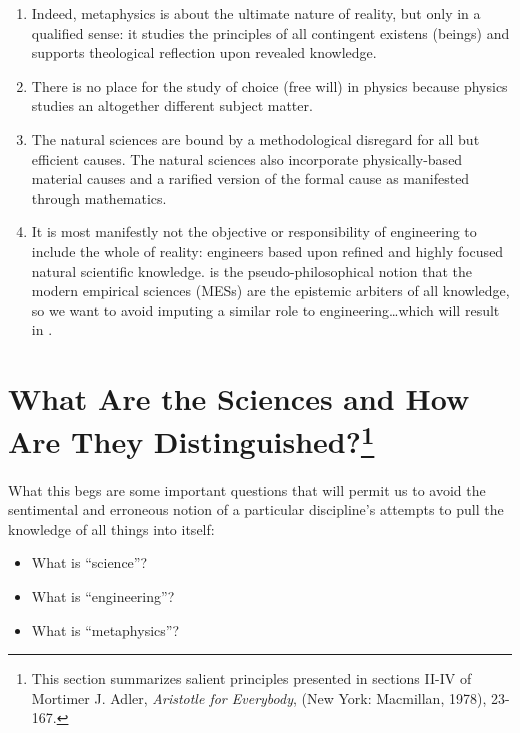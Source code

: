\begin{enumerate}
\item Indeed, metaphysics is about the ultimate nature of reality, but only in a qualified sense: it studies the principles of all contingent existens (beings) and supports theological reflection upon revealed knowledge.
\item There is no place for the study of choice (free will) in physics because physics studies an altogether different subject matter.
\item The natural sciences are  bound by a methodological disregard for all but efficient causes. The natural sciences also incorporate physically-based material causes and a rarified version of the formal cause as manifested through mathematics.
\item It is most manifestly not the objective or responsibility of engineering to include the whole of reality: engineers  based upon refined and highly focused natural scientific knowledge.  is the pseudo-philosophical notion that the modern empirical sciences (MESs) are the epistemic arbiters of all knowledge, so we want to avoid imputing a similar role to engineering\ldots which will result in .
\end{enumerate}

\section{What Are the Sciences and How Are They Distinguished?\footnote{This section summarizes salient principles presented in sections II-IV of Mortimer J. Adler, \textit{Aristotle for Everybody}, (New York: Macmillan, 1978), 23-167.}}

What this begs are some important questions that will permit us to avoid the sentimental and erroneous notion of a particular discipline's attempts to pull the knowledge of all things into itself:

\begin{itemize}
\item What is ``science''?
\item What is ``engineering''?
\item What is ``metaphysics''?
\end{itemize}

